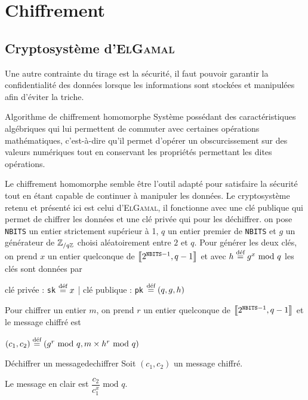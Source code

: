 \documentclass[a4paper, 12pt]{report}
\begin{document}
    \section{Chiffrement}
        \subsection{Cryptosystème d'\textsc{ElGamal}}
            Une autre contrainte du tirage est la sécurité, il faut pouvoir garantir la confidentialité des données lorsque les informations sont stockées et manipulées afin d'éviter la triche. 
            \begin{definition}{Algorithme de chiffrement homomorphe}{}
                Système possédant des caractéristiques algébriques qui lui permettent de commuter avec certaines opérations mathématiques, c'est-à-dire qu'il permet d'opérer un obscurcissement sur des valeurs numériques tout en conservant les propriétés permettant les dites opérations.\footnotemark
            \end{definition}
            Le chiffrement homomorphe semble être l'outil adapté pour satisfaire la sécurité tout en étant capable de continuer à manipuler les données. Le cryptosystème retenu et présenté ici est celui d'\textsc{ElGamal}, il fonctionne avec une clé publique qui permet de chiffrer les données et une clé privée qui pour les déchiffrer.
            \bigbreak
             on pose \texttt{NBITS} un entier strictement supérieur à 1, $q$ un entier premier de \texttt{NBITS} et $g$ un générateur de $\Z_{/q\Z}$ choisi aléatoirement entre $2$ et $q$.
            \bigbreak 
            Pour générer les deux clés, on prend $x$ un entier quelconque de $\ie{2^{\texttt{NBITS}-1},q-1}$ et avec $h\egdef g^x\text{ mod }q$ les clés sont données par
            \begin{tcolorbox}
                clé privée : \texttt{sk} $\egdef x$ | clé publique : \texttt{pk} $\egdef (q, g, h)$
            \end{tcolorbox}
            \bigbreak
            Pour chiffrer un entier $m$, on prend $r$ un entier quelconque de $\ie{2^{\texttt{NBITS}-1},q-1}$ et le message chiffré est 
            \begin{tcolorbox}
                $(c_1, c_2)\egdef (g^r\text{ mod }q, m\times h^r\text{ mod }q)$
            \end{tcolorbox}
            \begin{theorem}{Déchiffrer un message}{dechiffrer}
                Soit $(c_1, c_2)$ un message chiffré.
                
                Le message en clair est $\dfrac{c_2}{c_1^x}\text{ mod }q$.
            \end{theorem}
\end{document}

